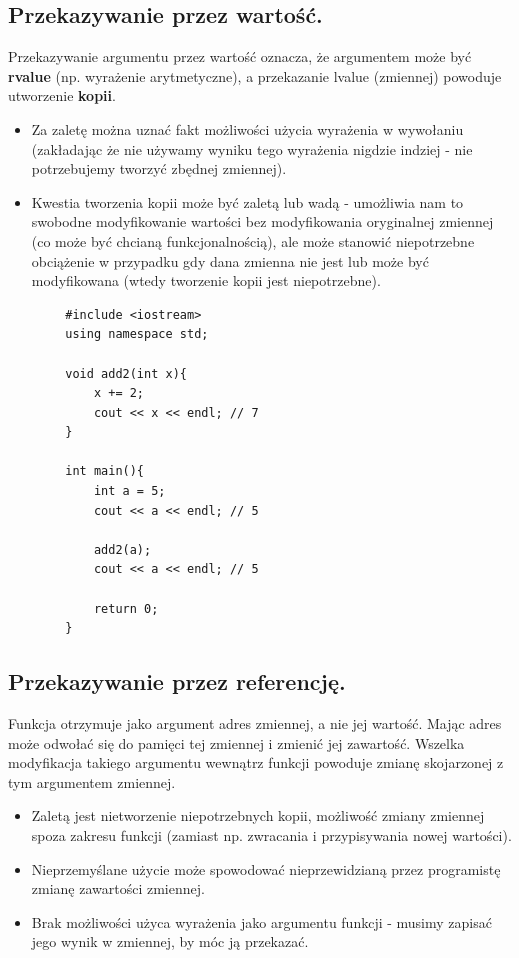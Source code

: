 \documentclass[12pt]{article}
\begin{document}
    \subsection{Przekazywanie przez wartość.}

    Przekazywanie argumentu przez wartość oznacza, że argumentem może być \textbf{rvalue} (np. wyrażenie arytmetyczne), a przekazanie
    lvalue (zmiennej) powoduje utworzenie \textbf{kopii}.
    \begin{itemize}
        \item Za zaletę można uznać fakt możliwości użycia wyrażenia w wywołaniu (zakładając że nie używamy wyniku tego
        wyrażenia nigdzie indziej - nie potrzebujemy tworzyć zbędnej zmiennej).
        \item Kwestia tworzenia kopii może być zaletą lub wadą - umożliwia nam to swobodne modyfikowanie wartości
        bez modyfikowania oryginalnej zmiennej (co może być chcianą funkcjonalnością), ale może stanowić niepotrzebne obciążenie
        w przypadku gdy dana zmienna nie jest lub może być modyfikowana (wtedy tworzenie kopii jest niepotrzebne).
    \end{itemize}

    \begin{verbatim}
        #include <iostream>
        using namespace std;

        void add2(int x){
            x += 2;
            cout << x << endl; // 7
        }

        int main(){
            int a = 5;
            cout << a << endl; // 5

            add2(a);
            cout << a << endl; // 5

            return 0;
        }
    \end{verbatim}

    \subsection{Przekazywanie przez referencję.}
    Funkcja otrzymuje jako argument adres zmiennej, a nie jej wartość. Mając adres może odwołać się do pamięci tej
    zmiennej i zmienić jej zawartość. Wszelka modyfikacja takiego argumentu wewnątrz funkcji powoduje zmianę skojarzonej
    z tym argumentem zmiennej.
    \begin{itemize}
        \item Zaletą jest nietworzenie niepotrzebnych kopii, możliwość zmiany zmiennej spoza zakresu funkcji (zamiast
        np. zwracania i przypisywania nowej wartości).
        \item Nieprzemyślane użycie może spowodować nieprzewidzianą przez programistę zmianę zawartości zmiennej.
        \item Brak możliwości użyca wyrażenia jako argumentu funkcji - musimy zapisać jego wynik w zmiennej, by móc
        ją przekazać.
    \end{itemize}
\end{document}
